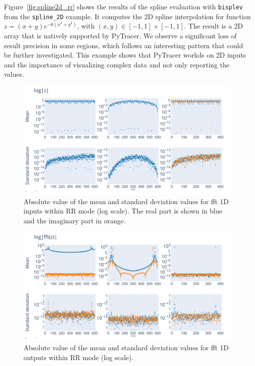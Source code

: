 \documentclass[10pt,journal,compsoc]{IEEEtran}
\newcommand{\pytracer}[0]{PyTracer\xspace}
\DeclareRobustCommand{\add}[1]{\textcolor{ao(english)}{#1}}%
\DeclareRobustCommand{\add}[1]{#1}
\begin{document}
Figure~\ref{fig:spline2d_rr} \add{shows the results of the spline evaluation with
    \texttt{bisplev} from the \texttt{spline\_2D} example. It computes the 2D spline
    interpolation for function $z=(x+y)e^{-6(x^2+y^2)}$, with $(x,y) \in
        [-1,1]\times[-1,1]$. The result is a 2D array that is natively supported by
    PyTracer. We observe a significant loss of \add{result} precision in some regions, which follows
    an interesting pattern that could be further investigated.
    This example shows that \pytracer workds on 2D inputs and the importance of
    visualizing complex data and not only reporting the values.}


\begin{figure}
    \centering
    \includegraphics[width=\linewidth]{figure/FFT/fft_x.pdf}
    \caption{Absolute value of the mean and standard deviation values for fft 1D
        inputs within RR mode (log scale). The real part is shown in blue and
        the imaginary part in orange.}
    \label{fig:fft1D_inputs}
\end{figure}

\begin{figure}
    \centering
    \includegraphics[width=\linewidth]{figure/FFT/fft_y.pdf}
    \caption{Absolute value of the mean and standard deviation values
        for fft 1D outputs within RR mode (log scale).}
    \label{fig:fft1D_outputs}
\end{figure}
\end{document}
